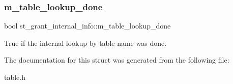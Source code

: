 \subsubsection{\texorpdfstring{m\+\_\+table\+\_\+lookup\+\_\+done}{m\_table\_lookup\_done}}
{\footnotesize\ttfamily bool st\+\_\+grant\+\_\+internal\+\_\+info\+::m\+\_\+table\+\_\+lookup\+\_\+done}

True if the internal lookup by table name was done. 

The documentation for this struct was generated from the following file\+:\begin{DoxyCompactItemize}
\item 
table.\+h\end{DoxyCompactItemize}
